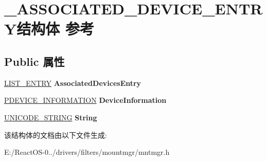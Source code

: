 \hypertarget{struct___a_s_s_o_c_i_a_t_e_d___d_e_v_i_c_e___e_n_t_r_y}{}\section{\+\_\+\+A\+S\+S\+O\+C\+I\+A\+T\+E\+D\+\_\+\+D\+E\+V\+I\+C\+E\+\_\+\+E\+N\+T\+R\+Y结构体 参考}
\label{struct___a_s_s_o_c_i_a_t_e_d___d_e_v_i_c_e___e_n_t_r_y}
\subsection*{Public 属性}
\begin{DoxyCompactItemize}
\item 
\mbox{\label{struct___a_s_s_o_c_i_a_t_e_d___d_e_v_i_c_e___e_n_t_r_y_a10ddf1cd2c3bfe7f344f5bcd0a57d93c}} 
\hyperlink{struct___l_i_s_t___e_n_t_r_y}{L\+I\+S\+T\+\_\+\+E\+N\+T\+RY} {\bfseries Associated\+Devices\+Entry}
\item 
\mbox{\label{struct___a_s_s_o_c_i_a_t_e_d___d_e_v_i_c_e___e_n_t_r_y_afae12c038ccbbdc6a72730a3e6f4a1b3}} 
\hyperlink{struct___d_e_v_i_c_e___i_n_f_o_r_m_a_t_i_o_n}{P\+D\+E\+V\+I\+C\+E\+\_\+\+I\+N\+F\+O\+R\+M\+A\+T\+I\+ON} {\bfseries Device\+Information}
\item 
\mbox{\label{struct___a_s_s_o_c_i_a_t_e_d___d_e_v_i_c_e___e_n_t_r_y_a30c37ddd447cbed6ace139c1c82e7596}} 
\hyperlink{struct___u_n_i_c_o_d_e___s_t_r_i_n_g}{U\+N\+I\+C\+O\+D\+E\+\_\+\+S\+T\+R\+I\+NG} {\bfseries String}
\end{DoxyCompactItemize}


该结构体的文档由以下文件生成\+:\begin{DoxyCompactItemize}
\item 
E\+:/\+React\+O\+S-\/0../drivers/filters/mountmgr/mntmgr.\+h\end{DoxyCompactItemize}
